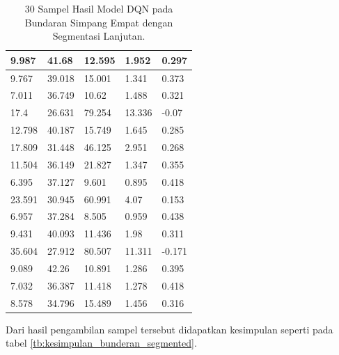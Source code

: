 \begin{table}[H]
{\begin{tabular}{|l|l|l|l|l|}
			9.987           & 41.68      & 12.595           & 1.952           & 0.297       \\ \hline
			9.767           & 39.018     & 15.001           & 1.341           & 0.373       \\ \hline
			7.011           & 36.749     & 10.62            & 1.488           & 0.321       \\ \hline
			17.4            & 26.631     & 79.254           & 13.336          & -0.07       \\ \hline
			12.798          & 40.187     & 15.749           & 1.645           & 0.285       \\ \hline
			17.809          & 31.448     & 46.125           & 2.951           & 0.268       \\ \hline
			11.504          & 36.149     & 21.827           & 1.347           & 0.355       \\ \hline
			6.395           & 37.127     & 9.601            & 0.895           & 0.418       \\ \hline
			23.591          & 30.945     & 60.991           & 4.07            & 0.153       \\ \hline
			6.957           & 37.284     & 8.505            & 0.959           & 0.438       \\ \hline
			9.431           & 40.093     & 11.436           & 1.98            & 0.311       \\ \hline
			35.604          & 27.912     & 80.507           & 11.311          & -0.171      \\ \hline
			9.089           & 42.26      & 10.891           & 1.286           & 0.395       \\ \hline
			7.032           & 36.387     & 11.418           & 1.278           & 0.418       \\ \hline
			8.578           & 34.796     & 15.489           & 1.456           & 0.316       \\ \hline
		\end{tabular}%
	}
	\caption{30 Sampel Hasil Model DQN pada Bundaran Simpang Empat dengan Segmentasi Lanjutan.}
	\label{tb:hasilpengujian_bunderan_segmented}
\end{table}

Dari hasil pengambilan sampel tersebut didapatkan kesimpulan seperti pada tabel \ref{tb:kesimpulan_bunderan_segmented}.


\begin{table}[H]
	\caption{Kesimpulan Hasil Model DQN pada Bundaran Simpang Empat dengan Segmentasi Lanjutan.}
	\label{tb:kesimpulan_bunderan_segmented}
\end{table}

